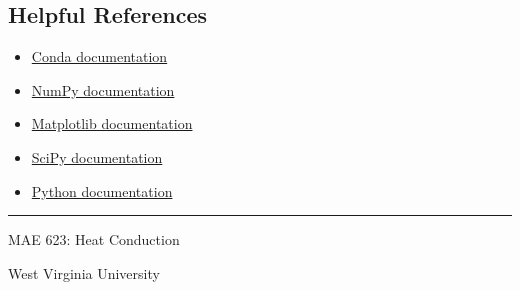 \documentclass[11pt]{article}
\begin{document}
\subsection*{Helpful References}

\begin{itemize}

    \item
    \href{https://docs.conda.io/}
         {Conda documentation}

    \item
    \href{https://numpy.org/doc/}
         {NumPy documentation}

    \item
    \href{https://matplotlib.org/stable/}
         {Matplotlib documentation}

    \item
    \href{https://docs.scipy.org/doc/scipy/}
         {SciPy documentation}

    \item
    \href{https://docs.python.org/3/}
         {Python documentation}

\end{itemize}

\vfill

\begin{center}
\small
\rule{0.55\textwidth}{0.4pt}

MAE 623: Heat Conduction

West Virginia University
\end{center}
\end{document}
